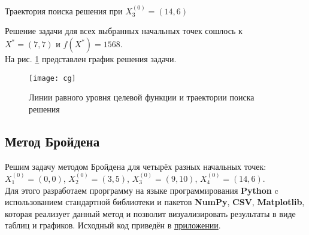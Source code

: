 \begin{table}[H]
\begin{center}
	\caption{Траектория поиска решения при $X_3^{(0)} = (14, 6)$}
	\label{tab:trajectory-cg-3}
	\def\tabcolsep{10pt}
	\def\arraystretch{1.23}
	\fontsize{13}{14}\selectfont
\end{center}
\end{table}

Решение задачи для всех выбранных начальных точек сошлось к\\ $X^* = (7, 7)$ и $f(X^*) = 1568$.\\

На рис. \ref{pic:cg} представлен график решения задачи.

\begin{figure}[H]
\begin{center}
	\texttt{[image: cg]}
	\caption{Линии равного уровня целевой функции и траектории поиска решения}
	\label{pic:cg}
\end{center}
\end{figure}

\subsection{Метод Бройдена}

Решим задачу методом Бройдена для четырёх разных начальных точек: $X_1^{(0)} = (0, 0)$, $X_2^{(0)} = (3, 5)$, $X_3^{(0)} = (9, 10)$, $X_4^{(0)} = (14, 6)$.\\

Для этого разработаем прорграмму на языке программирования \textbf{Python} c использованием стандартной библиотеки и пакетов \textbf{NumPy}, \textbf{CSV}, \textbf{Matplotlib}, которая реализует данный метод и позволит визуализировать результаты в виде таблиц и графиков.  Исходный код приведён в \hyperref[sec:application]{приложении}.\\

